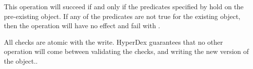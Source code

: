 \item This operation will succeed if and only if the predicates specified by
     hold on the pre-existing object.  If any of the predicates are
    not true for the existing object, then the operation will have no effect and
    fail with .

    All checks are atomic with the write.  HyperDex guarantees that no other
    operation will come between validating the checks, and writing the new
    version of the object..

